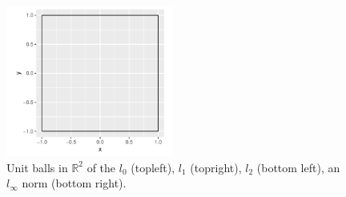 \documentclass[12pt, twoside]{article}
\newcommand{\R}{\mathbb{R}}
\newcommand{\1}{\mathbb{1}}
\begin{document}
\begin{figure}[ht]
    \includegraphics[width=0.49\textwidth]{plots/unit_circle_inf.pdf}
    \caption{Unit balls in $\R^2$ of the $l_0$ (topleft), $l_1$ (topright), $l_2$ (bottom left), an $l_\infty$ norm (bottom right).}
    \label{fig:input}
\end{figure}


\clearpage
 
{}
\nocite{maierhoferCoFD}

\end{document}
